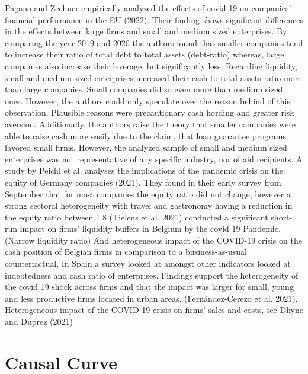 Pagano and Zechner empirically analyzed the effects of covid 19 on companies’ financial performance in the EU (2022). Their finding shows significant differences in the effects between large firms and small and medium sized enterprises. 
By comparing the year 2019 and 2020 the authors found that smaller companies tend to increase their ratio of total debt to total assets (debt-ratio) whereas, large companies also increase their leverage, but significantly less.
Regarding liquidity, small and medium sized enterprises increased their cash to total assets ratio more than large companies. Small companies did so even more than medium sized ones. However, the authors could only speculate over the reason behind of this observation. Plausible reasons were precautionary cash hording and greater risk aversion. Additionally, the authors raise the theory that smaller companies were able to raise cash more easily due to the claim, that loan guarantee programs favored small firms. However, the analyzed sample of small and medium sized enterprises was not representative of any specific industry, nor of aid recipients. 
A study by Peichl et al. analyses the implications of the pandemic crisis on the equity of Germany companies (2021). They found in their early survey from September that for most companies the equity ratio did not change, however a strong sectoral heterogeneity with travel and gastronomy having a reduction in the equity ratio between 1.8 %
(Tielens et al. 2021) conducted a significant short-run impact on firms’ liquidity buffers in Belgium by the covid 19 Pandemic. (Narrow liquidity ratio) And heterogeneous impact of the COVID-19 crisis on the cash position of Belgian firms in comparison to a business-as-usual counterfactual.
In Spain a survey looked at amongst other indicators looked at indebtedness and cash ratio of enterprises. Findings support the heterogeneity of the covid 19 shock across firms and that the impact was larger for small, young and less productive firms located in urban areas. (Fernández-Cerezo et al. 2021).
Heterogeneous impact of the COVID-19 crisis on firms’ sales and costs, see Dhyne and Duprez (2021)





\section{Causal Curve}

